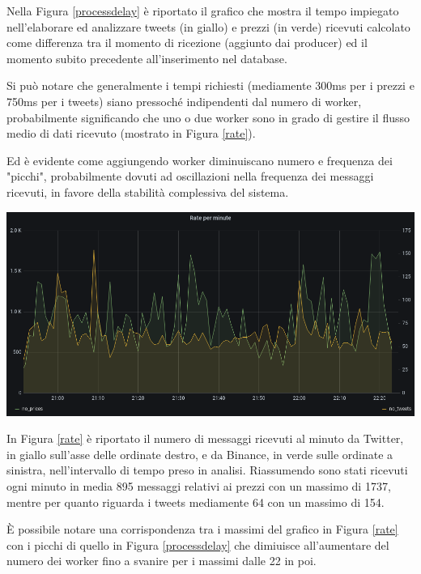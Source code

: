 Nella Figura \ref{processdelay} è riportato il grafico che mostra il tempo impiegato
nell'elaborare ed analizzare tweets
(in giallo) e prezzi (in verde) ricevuti calcolato come differenza tra il momento di ricezione
(aggiunto dai producer) ed il momento subito precedente all'inserimento nel database.

Si può notare che generalmente i tempi richiesti (mediamente 300ms per i prezzi e 750ms per
i tweets) siano pressoché indipendenti dal numero di worker,
probabilmente significando che uno o due worker sono in grado di gestire il flusso medio di dati
ricevuto (mostrato in Figura \ref{rate}).

Ed è evidente come aggiungendo worker diminuiscano numero e 
frequenza dei "picchi", probabilmente dovuti ad oscillazioni nella frequenza dei messaggi ricevuti,
in favore della stabilità complessiva del sistema.

\begin{center}
    \includegraphics[max width=\linewidth]{rate.png}
    \label{rate}
\end{center}

In Figura \ref{rate} è riportato il numero di messaggi ricevuti al minuto da Twitter, in giallo
sull'asse delle ordinate destro, e da Binance, in verde sulle ordinate a sinistra, nell'intervallo
di tempo preso in analisi.
Riassumendo sono stati ricevuti ogni minuto in media 895 messaggi relativi ai prezzi con un
massimo di 1737, mentre per quanto riguarda i tweets mediamente 64 con un massimo di 154. 

È possibile notare una corrispondenza tra i massimi del grafico in Figura \ref{rate} con i picchi
di quello in Figura \ref{processdelay} che dimiuisce all'aumentare del numero dei worker fino
a svanire per i massimi dalle 22 in poi.

